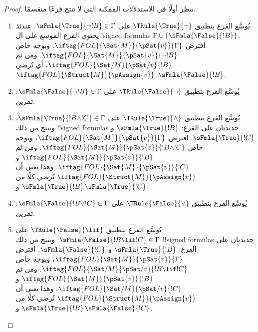 \documentclass[../../../include/open-logic-section]{subfiles}
\begin{document}
\begin{proof}
ننظر أولًا في الاستدلالات الممكنة التي لا تنتج فرعًا منقسمًا.
\begin{enumerate}
\item يُوسَّع الفرع بتطبيق $\TRule{\True}{\lnot}$ على
  $\sFmla{\True}{\lnot !B} \in \Gamma$. عندئذ يحتوي الفرع الموسع على
  ال!!{signed formula}s $\Gamma \cup
  \{\sFmla{\False}{!B}\}$. افترض
  $\iftag{FOL}{\Sat{M}}{\pSat{v}}{\Gamma}$. وبوجه خاص
  $\iftag{FOL}{\Sat{M}}{\pSat{v}}{\lnot !B}$. ومن ثم
  $\iftag{FOL}{\Sat/{M}}{\pSat/{v}}{!B}$، أي
  تُرضي $\iftag{FOL}{\Struct{M}}{\pAssign{v}}$
  $\sFmla{\False}{!B}$.
\item يُوسَّع الفرع بتطبيق $\TRule{\False}{\lnot}$ على
  $\sFmla{\False}{\lnot !B} \in \Gamma$: تمرين.
\item يُوسَّع الفرع بتطبيق $\TRule{\True}{\land}$ على
  $\sFmla{\True}{!B \land !C} \in \Gamma$، وينتج من ذلك
  !!{signed formula}s جديدتان على الفرع: $\sFmla{\True}{!B}$ و
  $\sFmla{\True}{!C}$. افترض
  $\iftag{FOL}{\Sat{M}}{\pSat{v}}{\Gamma}$، وبوجه خاص
  $\iftag{FOL}{\Sat{M}}{\pSat{v}}{!B \land !C}$. ومن ثم
  $\iftag{FOL}{\Sat{M}}{\pSat{v}}{!B}$ و
  $\iftag{FOL}{\Sat{M}}{\pSat{v}}{!C}$. وهذا يعني أن
  $\iftag{FOL}{\Struct{M}}{\pAssign{v}}$ تُرضي كلًا من
  $\sFmla{\True}{!B}$ و$\sFmla{\True}{!C}$.
\item يُوسَّع الفرع بتطبيق $\TRule{\False}{\lor}$ على
  $\sFmla{\False}{!B \lor !C} \in \Gamma$: تمرين.
\item يُوسَّع الفرع بتطبيق $\TRule{\False}{\lif}$ على
  $\sFmla{\False}{!B \lif !C} \in \Gamma$: وينتج من ذلك
  !!{signed formula}s جديدتان على الفرع: $\sFmla{\True}{!B}$ و
  $\sFmla{\False}{!C}$. افترض
  $\iftag{FOL}{\Sat{M}}{\pSat{v}}{\Gamma}$، وبوجه خاص
  $\iftag{FOL}{\Sat/{M}}{\pSat/{v}}{!B \lif !C}$. ومن ثم
  $\iftag{FOL}{\Sat{M}}{\pSat{v}}{!B}$ و
  $\iftag{FOL}{\Sat/{M}}{\pSat/{v}}{!C}$. وهذا يعني أن
  $\iftag{FOL}{\Struct{M}}{\pAssign{v}}$ تُرضي كلًا من
  $\sFmla{\True}{!B}$ و$\sFmla{\False}{!C}$.

\end{enumerate}
\end{proof}
\end{document}
